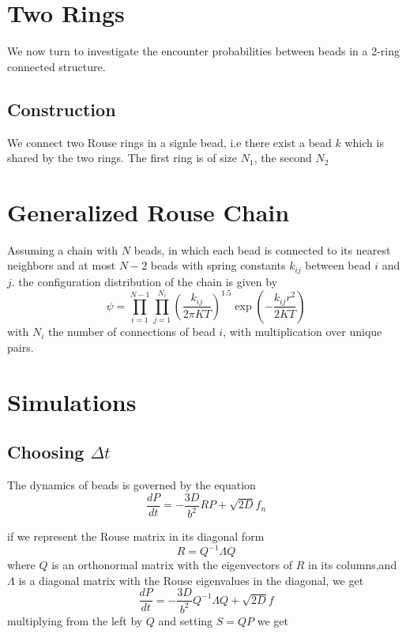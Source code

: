 \documentclass{report}
\begin{document}
\section{Two Rings}\label{section_twoRings}
We now turn to investigate the encounter probabilities between beads in a 2-ring connected structure. 
\subsection{Construction}\label{subsection_twoRingsConstruction}
We connect two Rouse rings in a signle bead, i.e there exist a bead $k$ which is shared by the two rings. The first ring is of size $N_1$, the second $N_2$
 

 
\section{Generalized Rouse Chain}\label{section_generalizedRouseChain}
Assuming a chain with $N$ beads, in which each bead is connected to its nearest neighbors and at most $N-2$ beads with spring constants $k_{ij}$ between bead $i$ and $j$. the configuration distribution of the chain is given by 
\begin{equation*}
\psi = \prod_{i=1}^{N-1}\prod_{j=1}^{N_i}\left(\frac{k_{ij}}{2\pi KT}\right)^{1.5}\exp\left(-\frac{k_{ij}r^2}{2KT}\right)
\end{equation*}
with $N_i$ the number of connections of bead $i$, with multiplication over unique pairs. 

\section{Simulations}
\subsection{Choosing $\Delta t$}
The dynamics of beads is governed by the equation
\begin{equation*}
\frac{dP}{dt} = -\frac{3D}{b^2}RP+\sqrt{2D}f_n
\end{equation*}

if we represent the Rouse matrix in its diagonal form 
\begin{equation*}
R=Q^{-1}\Lambda Q
\end{equation*}
where $Q$ is an orthonormal matrix with the eigenvectors of $R$ in its columns,and $\Lambda$ is a diagonal matrix with the Rouse eigenvalues in the diagonal, we get 
\begin{equation*}
\frac{dP}{dt} = -\frac{3D}{b^2}Q^{-1}\Lambda Q+\sqrt{2D}f
\end{equation*}
multiplying from the left by $Q$ and setting $S=QP$ we get 
\end{document}
